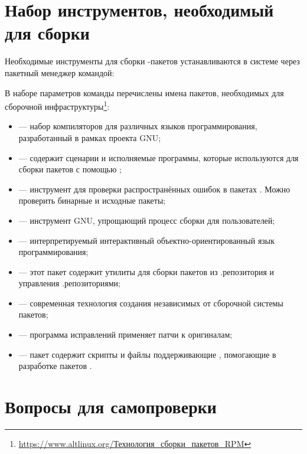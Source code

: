 \section{Набор инструментов, необходимый для сборки}

Необходимые инструменты для сборки -пакетов устанавливаются 
в системе через пакетный менеджер  командой:\\


В наборе параметров команды  перечислены имена пакетов, необходимых для сборочной 
инфраструктуры\footnote{\href{https://www.altlinux.org/\%D0\%A2\%D0\%B5\%D1\%85\%D0\%BD\%D0\%BE\%D0\%BB\%D0\%BE\%D0\%B3\%D0\%B8\%D1\%8F_\%D1\%81\%D0\%B1\%D0\%BE\%D1\%80\%D0\%BA\%D0\%B8_\%D0\%BF\%D0\%B0\%D0\%BA\%D0\%B5\%D1\%82\%D0\%BE\%D0\%B2_RPM}{https://www.altlinux.org/Технология\_сборки\_пакетов\_RPM}}:

\begin{itemize}
	\item {} --- набор компиляторов для различных языков программирования, разработанный в рамках проекта GNU;
	\item {} --- содержит сценарии и исполняемые программы, которые используются для сборки пакетов с помощью ;
	\item {} --- инструмент для проверки распространённых ошибок в пакетах . Можно проверить бинарные и исходные пакеты;
	\item {} --- инструмент GNU, упрощающий процесс сборки для пользователей;
	\item {} --- интерпретируемый интерактивный объектно-ориентированный язык программирования;
	\item {} --- этот пакет содержит утилиты для сборки пакетов  из .репозитория и управления .репозиториями;
	\item {} --- современная технология создания независимых от сборочной системы пакетов;
	\item {} --- программа исправлений применяет патчи к оригиналам;
	\item {} --- пакет содержит скрипты и файлы поддерживающие , помогающие в разработке пакетов .
\end{itemize}

\section{Вопросы для самопроверки}

